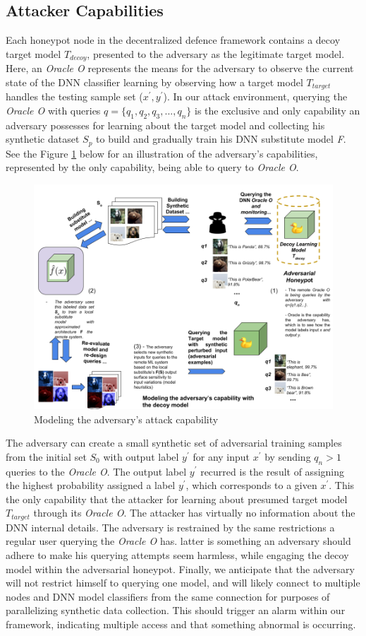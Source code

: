 \documentclass[grad,lot,lof,11pt,oneside,onehalfspace]{RUthesis}
\begin{document}
\subsection{Attacker Capabilities}
Each honeypot node  in the decentralized defence framework contains a decoy target model \textit{$T_{decoy}$}, presented to the adversary as the legitimate target model. Here, an \textit{Oracle O} represents the means for the adversary to observe the current state of the DNN classifier learning by observing how a target model \textit{$T_{target}$} handles the testing sample set ($x^{'},y^{'}$). In our attack environment, querying the \textit{Oracle O} with queries $q = \{q_{1}, q_{2}, q_{3},..., q_{n}\}$ is the exclusive and only capability an adversary possesses for learning about the target model and collecting his synthetic dataset \textit{$S_{p}$} to build and gradually train his DNN substitute model \textit{F}. See the Figure \ref{fig:attackcap} below for an illustration of the adversary's capabilities, represented by the only capability, being able to query to \textit{Oracle O}.
\newline
\begin{figure}[h]
\centering
\includegraphics[width=0.7\linewidth]{"Images/Chapter 4/attackcap"}
\caption{Modeling the adversary's attack capability}
\label{fig:attackcap}
\end{figure}

The adversary can create a small synthetic set of adversarial training samples from the initial set \textit{$S_{0}$} with output label $y^{'}$ for any input $x^{'}$ by sending $q_{n} > 1$ queries to the \textit{Oracle O}. The output label $y^{'}$ recurred is the result of assigning the highest probability assigned a label $y^{'}$, which corresponds to a given $x^{'}$. This the only capability that the attacker for learning about presumed target model \textit{$T_{target}$} through its \textit{Oracle O}. The attacker has virtually no information about the DNN internal details. The adversary is restrained by the same restrictions a regular user querying the \textit{Oracle O} has. latter is something an adversary should adhere to make his querying attempts seem harmless, while engaging the decoy model within the adversarial honeypot. Finally, we anticipate that the adversary will not restrict himself to querying one model, and will likely connect to multiple nodes and DNN model  classifiers from the same connection for purposes of parallelizing synthetic data collection. This should trigger an alarm within our framework, indicating multiple access and that something abnormal is occurring. 
\end{document}
